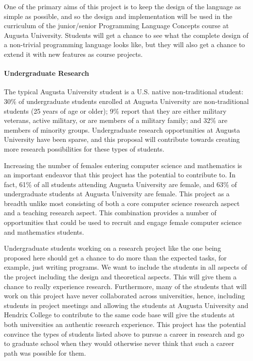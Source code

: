 One of the primary aims of this project is to keep the design of the
language as simple as possible, and so the design and implementation
will be used in the curriculum of the junior/senior Programming
Language Concepts course at Augusta University.  Students will get a
chance to see what the complete design of a non-trivial programming
language looks like, but they will also get a chance to extend it with
new features as course projects.

\paragraph{Undergraduate Research}  The typical Augusta University
student is a U.S. native non-traditional student: 30\% of
undergraduate students enrolled at Augusta University are
non-traditional students (25 years of age or older); 9\% report that
they are either military veterans, active military, or are members of
a military family; and 32\% are members of minority groups.
Undergraduate research opportunities at Augusta University have been
sparse, and this proposal will contribute towards creating more
research possibilities for these types of students.


Increasing the number of females entering computer science and
mathematics is an important endeavor that this project has the
potential to contribute to.  In fact, 61\% of all students attending
Augusta University are female, and 63\% of undergraduate students at
Augusta University are female.  This project as a breadth unlike most
consisting of both a core computer science research aspect and a
teaching research aspect.  This combination provides a number of
opportunities that could be used to recruit and engage female computer
science and mathematics students.

Undergraduate students working on a research project like the one
being proposed here should get a chance to do more than the expected
tasks, for example, just writing programs.  We want to include the
students in all aspects of the project including the design and
theoretical aspects.  This will give them a chance to really
experience research.  Furthermore, many of the students that will work
on this project have never collaborated across universities, hence,
including students in project meetings and allowing the students at
Augusta University and Hendrix College to contribute to the same code
base will give the students at both universities an authentic research
experience.  This project has the potential convince the types of
students listed above to pursue a career in research and go to
graduate school when they would otherwise never think that such a
career path was possible for them.

